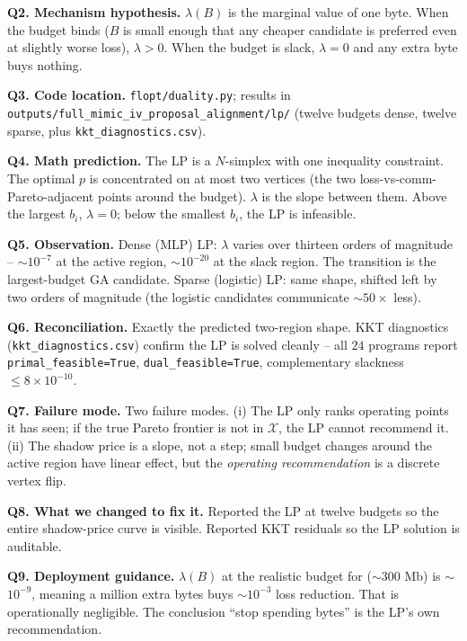 \textbf{Q2. Mechanism hypothesis.}
$\lambda(B)$ is the marginal value of one byte. When the budget binds
($B$ is small enough that any cheaper candidate is preferred even at
slightly worse loss), $\lambda > 0$. When the budget is slack, $\lambda
\!=\! 0$ and any extra byte buys nothing.

\textbf{Q3. Code location.}
\texttt{flopt/duality.py}; results in
\texttt{outputs/full\_mimic\_iv\_proposal\_alignment/lp/} (twelve
budgets dense, twelve sparse, plus
\texttt{kkt\_diagnostics.csv}).

\textbf{Q4. Math prediction.}
The LP is a $N$-simplex with one inequality constraint. The optimal
$p$ is concentrated on at most two vertices (the two
loss-vs-comm-Pareto-adjacent points around the budget). $\lambda$ is
the slope between them. Above the largest $b_i$, $\lambda \!=\! 0$;
below the smallest $b_i$, the LP is infeasible.

\textbf{Q5. Observation.}
Dense (MLP) LP: $\lambda$ varies over thirteen orders of magnitude --
$\sim$$10^{-7}$ at the active region, $\sim$$10^{-20}$ at the slack
region. The transition is the largest-budget GA candidate. Sparse
(logistic) LP: same shape, shifted left by two orders of magnitude
(the logistic candidates communicate $\sim$$50\!\times$ less).

\textbf{Q6. Reconciliation.}
Exactly the predicted two-region shape. KKT diagnostics
(\texttt{kkt\_diagnostics.csv}) confirm the LP is solved cleanly --
all $24$ programs report \texttt{primal\_feasible=True},
\texttt{dual\_feasible=True}, complementary slackness $\leq 8\!\times\!
10^{-10}$.

\textbf{Q7. Failure mode.}
Two failure modes. (i) The LP only ranks operating points it has seen;
if the true Pareto frontier is not in $\mathcal{X}$, the LP cannot
recommend it. (ii) The shadow price is a slope, not a step; small
budget changes around the active region have linear effect, but the
\emph{operating recommendation} is a discrete vertex flip.

\textbf{Q8. What we changed to fix it.}
Reported the LP at twelve budgets so the entire shadow-price curve
is visible. Reported KKT residuals so the LP solution is auditable.

\textbf{Q9. Deployment guidance.}
$\lambda(B)$ at the realistic budget for \mimic{} ($\sim$$300$ Mb) is
$\sim$$10^{-9}$, meaning a million extra bytes buys $\sim$$10^{-3}$
loss reduction. That is operationally negligible. The conclusion
``stop spending bytes'' is the LP's own recommendation.

